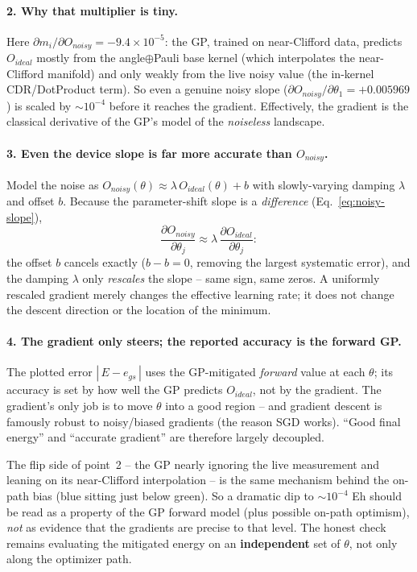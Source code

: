 \documentclass[11pt]{article}
\def\bm#1{#1}%
\def\mathrm#1{#1}%
\newcommand{\egs}{e_{\mathrm{gs}}}
\begin{document}
\paragraph{2. Why that multiplier is tiny.}
Here $\partial m_i/\partial O_{\mathrm{noisy}}=-9.4\times10^{-5}$: the GP, trained
on near-Clifford data, predicts $O_{\mathrm{ideal}}$ mostly from the
angle$\oplus$Pauli base kernel (which interpolates the near-Clifford manifold) and
only weakly from the live noisy value (the in-kernel CDR/DotProduct term). So even
a genuine noisy slope ($\partial O_{\mathrm{noisy}}/\partial\theta_1=+0.005969$)
is scaled by $\sim\!10^{-4}$ before it reaches the gradient. Effectively, the
gradient is the classical derivative of the GP's model of the \emph{noiseless}
landscape.

\paragraph{3. Even the device slope is far more accurate than $O_{\mathrm{noisy}}$.}
Model the noise as $O_{\mathrm{noisy}}(\bm\theta)\approx\lambda\,O_{\mathrm{ideal}}(\bm\theta)+b$
with slowly-varying damping $\lambda$ and offset $b$. Because the parameter-shift
slope is a \emph{difference} (Eq.~\eqref{eq:noisy-slope}),
\[
\frac{\partial O_{\mathrm{noisy}}}{\partial\theta_j}
\approx\lambda\,\frac{\partial O_{\mathrm{ideal}}}{\partial\theta_j}:
\]
the offset $b$ cancels exactly ($b-b=0$, removing the largest systematic error),
and the damping $\lambda$ only \emph{rescales} the slope -- same sign, same zeros.
A uniformly rescaled gradient merely changes the effective learning rate; it does
not change the descent direction or the location of the minimum.

\paragraph{4. The gradient only steers; the reported accuracy is the forward GP.}
The plotted error $|\,E-\egs\,|$ uses the GP-mitigated \emph{forward} value at each
$\bm\theta$; its accuracy is set by how well the GP predicts $O_{\mathrm{ideal}}$,
not by the gradient. The gradient's only job is to move $\bm\theta$ into a good
region -- and gradient descent is famously robust to noisy/biased gradients (the
reason SGD works). ``Good final energy'' and ``accurate gradient'' are therefore
largely decoupled.

\begin{tcolorbox}[colback=orange!5!white,colframe=orange!60!black,title=\textbf{Caveat}]
The flip side of point~2 -- the GP nearly ignoring the live measurement and
leaning on its near-Clifford interpolation -- is the same mechanism behind the
on-path bias (blue sitting just below green). So a dramatic dip to $\sim\!10^{-4}$
Eh should be read as a property of the GP forward model (plus possible on-path
optimism), \emph{not} as evidence that the gradients are precise to that level.
The honest check remains evaluating the mitigated energy on an \textbf{independent}
set of $\bm\theta$, not only along the optimizer path.
\end{tcolorbox}
\end{document}
